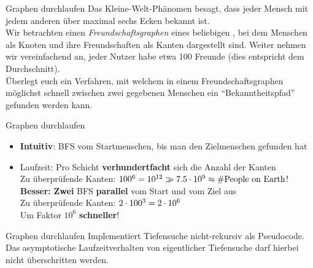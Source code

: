 \begin{frame}{Graphen durchlaufen}
	Das Kleine-Welt-Phänomen besagt, dass jeder Mensch mit jedem anderen über maximal sechs Ecken bekannt ist.\\
	\medskip
	Wir betrachten einen \emph{Freundschaftsgraphen} eines beliebigen , bei dem Menschen als Knoten und ihre Freundschaften als Kanten dargestellt sind.
	Weiter nehmen wir vereinfachend an, jeder Nutzer habe etwa 100 Freunde (dies entspricht dem Durchschnitt).\\
	\medskip
	Überlegt euch ein Verfahren, mit welchem in einem Freundschaftsgraphen möglichst schnell zwischen zwei gegebenen Menschen ein \enquote{Bekanntheitspfad} gefunden werden kann.
\end{frame}

\begin{frame}{Graphen durchlaufen}
	\solutionheading
	\begin{itemize}
		\item<+-> \textbf{Intuitiv}: BFS vom Startmenschen, bis man den Zielmenschen gefunden hat
		\item<+->[\Cons\symbitemnegoffset] Laufzeit: Pro Schicht \textbf{verhundertfacht} sich die Anzahl der Kanten \\
			\impl Zu überprüfende Kanten: \quad $100^6 = 10^{12} \gg 7.5 \cdot 10^9 \approx \text{\#People on Earth}$!
		\implitem<+-> \textbf{Besser: } \textbf{Zwei} BFS \textbf{parallel} vom Start und vom Ziel aus \\
			\impl Zu überprüfende Kanten: \quad $2 \cdot 100^3 = 2 \cdot 10^6$ \\
			\impl Um Faktor $10^6$ \textbf{schneller}!
	\end{itemize}
\end{frame}


\begin{frame}{Graphen durchlaufen}
	Implementiert Tiefensuche nicht-rekursiv als Pseudocode. Das asymptotische Laufzeitverhalten von eigentlicher Tiefensuche darf hierbei nicht überschritten werden.
\end{frame}

